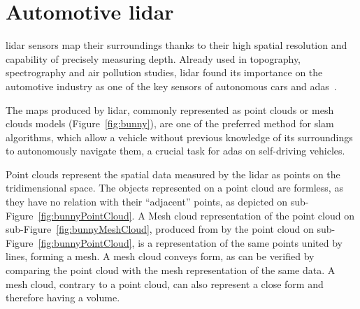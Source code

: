 \section{Automotive \ac{lidar}}
\label{sec:sota:automotive-lidar}
\ac{lidar} sensors map their surroundings thanks to their high spatial resolution and capability of precisely measuring depth. Already used in topography, spectrography and air pollution studies, \ac{lidar} found its importance on the automotive industry as one of the key sensors of autonomous cars and \ac{adas}~\cite{Sullivan2016}. 

The maps produced by \ac{lidar}, commonly represented as point clouds or mesh clouds models (Figure~\ref{fig:bunny}), are one of the preferred method for \ac{slam} algorithms, which allow a vehicle without previous knowledge of its surroundings to autonomously navigate them, a crucial task for \ac{adas} on self-driving vehicles.

Point clouds represent the spatial data measured by the \ac{lidar} as points on the tridimensional space. The objects represented on a point cloud are formless, as they have no relation with their ``adjacent'' points, as depicted on sub-Figure~\ref{fig:bunnyPointCloud}. A Mesh cloud representation of the point cloud on sub-Figure~\ref{fig:bunnyMeshCloud}, produced from by the point cloud on sub-Figure~\ref{fig:bunnyPointCloud}, is a representation of the same points united by lines, forming a mesh. A mesh cloud conveys form, as can be verified by comparing the point cloud with the mesh representation of the same data. A mesh cloud, contrary to a point cloud, can also represent a close form and therefore having a volume.

